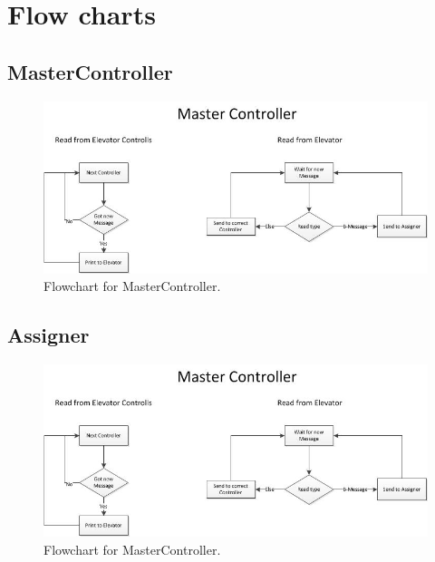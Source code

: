 \appendix
\section{Flow charts}
\label{app:charts}
\subsection{MasterController}
\label{app:charts:master}
\begin{figure}[h!]
\begin{center}
\includegraphics{FlowChart/MasterC.jpg}
\caption{Flowchart for MasterController.}
\label{chart:master}
\end{center}
\end{figure}

\subsection{Assigner}
\label{app:charts:master}
\begin{figure}[h!]
\begin{center}
\includegraphics{FlowChart/MasterC.jpg}
\caption{Flowchart for MasterController.}
\label{chart:master}
\end{center}
\end{figure}

